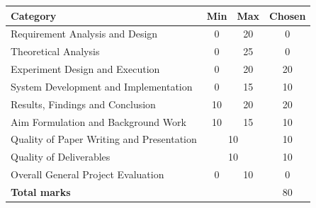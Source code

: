 \documentclass[Writeup.tex]{subfiles}
\begin{document}
\renewcommand{\arraystretch}{1.25}
\begin{tabular}{|l|c|c|c|}
  \hline
  \textbf{Category} & \textbf{Min} & \textbf{Max} & \textbf{Chosen} \\ \hline \hline
  Requirement Analysis and Design & 0 & 20 &
    0 \\ \hline
  Theoretical Analysis & 0 & 25 &
    0 \\ \hline
  Experiment Design and Execution & 0 & 20 &
    20 \\ \hline
  System Development and Implementation & 0 & 15 &
    10 \\ \hline
  Results, Findings and Conclusion & 10 & 20 &
    20 \\ \hline
  Aim Formulation and Background Work & 10 & 15 &
    10 \\ \hline
  Quality of Paper Writing and Presentation & \multicolumn{2}{c|}{10} &
    10 \\ \hline
  Quality of Deliverables & \multicolumn{2}{c|}{10} &
    10 \\ \hline
  Overall General Project Evaluation & 0 & 10 &
    0 \\ \hline
  \hline
  \multicolumn{3}{|l|}{\textbf{Total marks}} & 80 \\ \hline
\end{tabular}

\endgroup
\thispagestyle{empty}
\newpage
\setcounter{page}{1}
\end{document}

